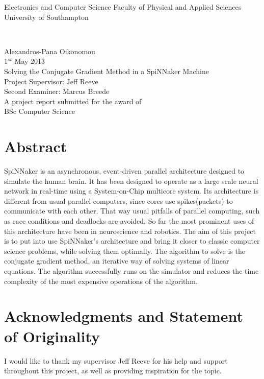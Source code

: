 \documentclass[12pt,a4paper]{article}
\author{Alexandros-Panagiotis Oikonomou}
\begin{document}
\begin{titlepage}
\begin{center}
\begin{LARGE}
Electronics and Computer Science
Faculty of Physical and Applied Sciences
University of Southampton 
\end{LARGE}
\\[2cm]
\begin{large}
Alexandros-Pana Oikonomou
\\
1$^{st}$ May 2013
\\[2cm]
Solving the Conjugate Gradient Method in a SpiNNaker Machine
\\[3.5cm]
Project Supervisor: Jeff Reeve
\\Second Examiner: Marcus Breede
\\[3.5cm]
A project report submitted for the award of
\\BSc Computer Science
\end{large}
\end{center}
\end{titlepage}
\section*{Abstract}
SpiNNaker is an asynchronous, event-driven parallel architecture designed to simulate
the human brain. It has been designed to operate as a large scale neural network in
real-time using a System-on-Chip multicore system. Its architecture is different from
usual parallel computers, since cores use spikes(packets) to communicate with each other. That
way usual pitfalls of parallel computing, such as race conditions and deadlocks are
avoided. So far the most prominent uses of this architecture have been in
neuroscience and robotics. The aim of this project is to put into use SpiNNaker's
architecture and bring it closer to classic computer science problems, while solving
them optimally. The algorithm to solve is the conjugate gradient
method, an iterative way of solving systems of linear equations. The algorithm successfully runs on the simulator and reduces the time complexity of the most expensive operations of the algorithm.
\newpage
\tableofcontents
\newpage
\section*{Acknowledgments and Statement of Originality}
I would like to thank my supervisor Jeff Reeve for his help and support throughout this project, as well as providing inspiration for the topic.
\newpage
\end{document}
